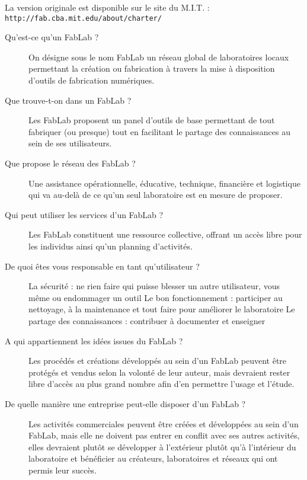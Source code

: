 {\small \begin{center}
La version originale est disponible sur le site du M.I.T. : \\ \texttt{http://fab.cba.mit.edu/about/charter/}
\end{center}}
\begin{description}
  \item[Qu'est-ce qu'un FabLab ?]
On désigne sous le nom FabLab un réseau global de laboratoires locaux permettant la création ou fabrication à travers la mise à disposition d'outils de fabrication numériques.

\item[Que trouve-t-on dans un FabLab ?]
Les FabLab proposent un panel d'outils de base permettant de tout fabriquer (ou presque) tout en facilitant le partage des connaissances au sein de ses utilisateurs.

\item[Que propose le réseau des FabLab ?]
Une assistance opérationnelle, éducative, technique, financière et logistique qui va au-delà de ce qu'un seul laboratoire est en mesure de proposer.

\item[Qui peut utiliser les services d'un FabLab ?]
Les FabLab constituent une ressource collective, offrant un accès libre pour les individus ainsi qu'un planning d'activités.

\item[De quoi êtes vous responsable en tant qu'utilisateur ?]
La sécurité : ne rien faire qui puisse blesser un autre utilisateur, vous même ou endommager un outil
Le bon fonctionnement : participer au nettoyage, à la maintenance et tout faire pour améliorer le laboratoire
Le partage des connaissances : contribuer à documenter et enseigner

\item[A qui appartiennent les idées issues du FabLab ?]
Les procédés et créations développés au sein d'un FabLab peuvent être protégés et vendus selon la volonté de leur auteur, mais devraient rester libre d'accès au plus grand nombre afin d'en permettre l'usage et l'étude.

\item[De quelle manière une entreprise peut-elle disposer d'un FabLab ?]
Les activités commerciales peuvent être créées et développées au sein d'un FabLab, mais elle ne doivent pas entrer en conflit avec ses autres activités, elles devraient plutôt se développer à l'extérieur plutôt qu'à l'intérieur du laboratoire et bénéficier au créateurs, laboratoires et réseaux qui ont permis leur succès.
\end{description}
